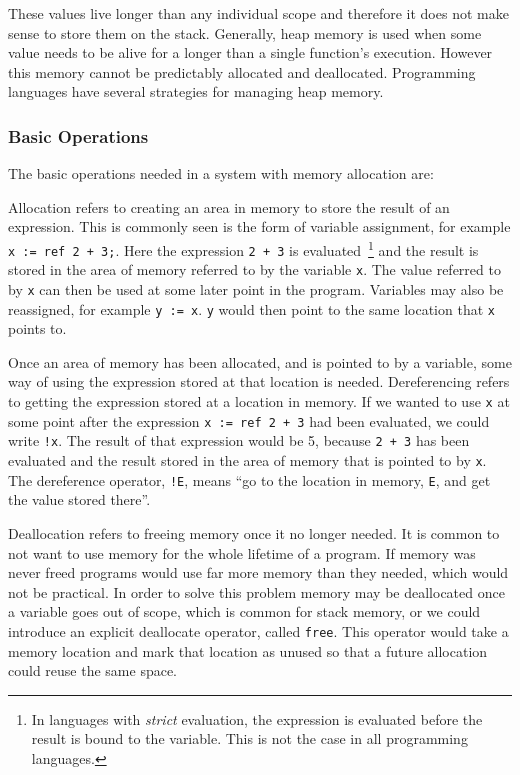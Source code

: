 These values live longer than any individual scope and therefore
it does not make sense to store them on the stack. Generally, heap memory is
used when some value needs to be alive for a longer than a single function's
execution. However this memory cannot be predictably allocated and deallocated.
Programming languages have several strategies for managing heap memory.


\subsubsection{Basic Operations}\label{sec:operations}
The basic operations needed in a system with memory allocation are:
\begin{description}[style=nextline]
    \item[Allocation]
        Allocation refers to creating an area in memory to store the result of
        an expression. This is commonly seen is the form of variable
        assignment, for example \lstinline{x := ref 2 + 3;}. Here the
        expression \lstinline{2 + 3} is evaluated~\footnote{In languages with
        \textit{strict} evaluation, the expression is evaluated before the
        result is bound to the variable. This is not the case in all
        programming languages.} and the result is stored in the area of memory
        referred to by the variable \lstinline{x}. The value referred to by
        \lstinline{x} can then be used at some later point in the program.
        Variables may also be reassigned, for example \lstinline{y := x}.
        \lstinline{y} would then point to the same location that \lstinline{x}
        points to.
    \item[Dereference]
        Once an area of memory has been allocated, and is pointed to by a
        variable, some way of using the expression stored at that location is
        needed. Dereferencing refers to getting the expression stored at a
        location in memory. If we wanted to use \lstinline{x} at some point
        after the expression \lstinline{x := ref 2 + 3} had been evaluated, we
        could write \lstinline{!x}. The result of that expression would be 5,
        because \lstinline{2 + 3} has been evaluated and the result stored in
        the area of memory that is pointed to by \lstinline{x}. The dereference
        operator, \lstinline{!E}, means ``go to the location in memory,
        \lstinline{E}, and get the value stored there''. 
    \item[Deallocation]
        Deallocation refers to freeing memory once it no longer needed. It is
        common to not want to use memory for the whole lifetime of a program.
        If memory was never freed programs would use far more memory than they
        needed, which would not be practical. In order to solve this problem
        memory may be deallocated once a variable goes out of scope, which is
        common for stack memory, or we could introduce an explicit deallocate
        operator, called \lstinline{free}. This operator would take a memory
        location and mark that location as unused so that a future allocation
        could reuse the same space.
\end{description}

